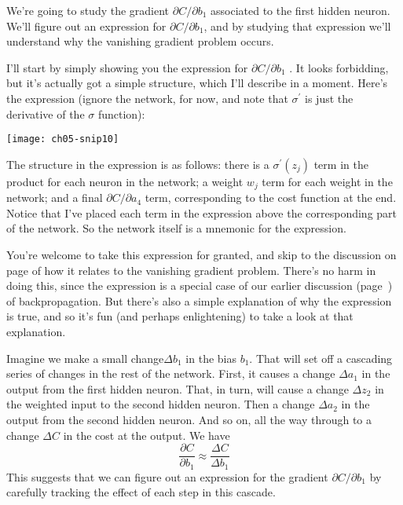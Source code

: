 We're going to study the gradient $\partial C / \partial b_{1}$ associated to the first hidden neuron. We'll figure out an expression for $\partial C / \partial b_{1}$, and by studying that expression we'll understand why the vanishing gradient problem occurs.

I'll start by simply showing you the expression for $\partial C / \partial b_{1}$
. It looks forbidding, but it's actually got a simple structure, which I'll describe in a moment. Here's the expression (ignore the network, for now, and note that $\sigma^\prime$ is just the derivative of the $\sigma$ function):

\begin{figure*}[tph]
    \texttt{[image: ch05-snip10]}
    \label{fig:ch05-snip10}
    \end{figure*}

The structure in the expression is as follows: there is a $\sigma^{\prime}\left(z_{j}\right)$ term in the product for each neuron in the network; a weight $w_j$ term for each weight in the network; and a final $\partial C / \partial a_{4}$
term, corresponding to the cost function at the end. Notice that I've placed each term in the expression above the corresponding part of the network. So the network itself is a mnemonic for the expression.

You're welcome to take this expression for granted, and skip to the discussion on page \pageref{page:Whythevanishinggradientproblemoccurs} of how it relates to the vanishing gradient problem. There's no harm in doing this, since the expression is a special case of our earlier discussion (page~\pageref{sec:Thefourfundamentalequationsbehindbackpropagation}) of backpropagation. But there's also a simple explanation of why the expression is true, and so it's fun (and perhaps enlightening) to take a look at that explanation.

Imagine we make a small change$\Delta b_{1}$ in the bias $b_1$. That will set off a cascading series of changes in the rest of the network. First, it causes a change $\Delta a_{1}$ in the output from the first hidden neuron. That, in turn, will cause a change  $\Delta z_{2}$ in the weighted input to the second hidden neuron. Then a change $\Delta a_{2}$ in the output from the second hidden neuron. And so on, all the way through to a change $\Delta C$ in the cost at the output. We have 
\begin{equation}
    \frac{\partial C}{\partial b_{1}} \approx \frac{\Delta C}{\Delta b_{1}}
    \label{eq:c05-114}
    \end{equation}
This suggests that we can figure out an expression for the gradient $\partial C / \partial b_{1}$ by carefully tracking the effect of each step in this cascade.


